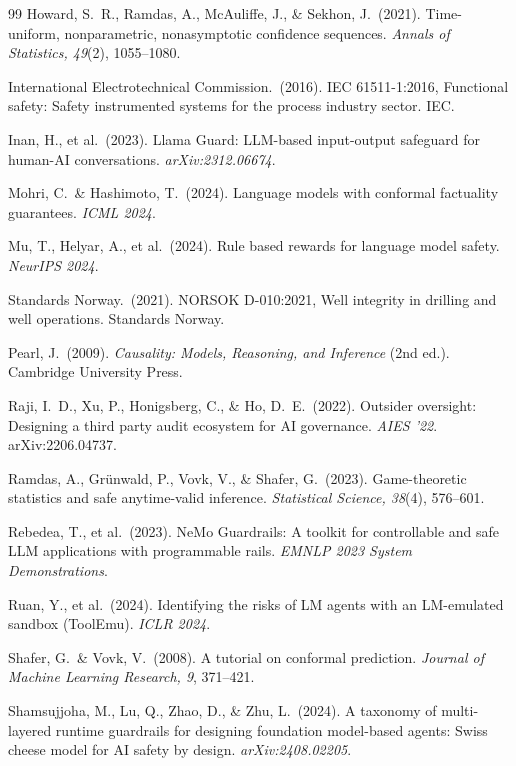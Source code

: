 \documentclass[10pt,twocolumn]{article}
\begin{document}
\begin{thebibliography}{99}
Howard, S.~R., Ramdas, A., McAuliffe, J., \& Sekhon, J.\ (2021).
Time-uniform, nonparametric, nonasymptotic confidence sequences.
\emph{Annals of Statistics, 49}(2), 1055--1080.

International Electrotechnical Commission.\ (2016).
IEC 61511-1:2016, Functional safety: Safety instrumented systems for the
process industry sector.
IEC.

Inan, H., et al.\ (2023).
Llama Guard: LLM-based input-output safeguard for human-AI conversations.
\emph{arXiv:2312.06674}.

Mohri, C.\ \& Hashimoto, T.\ (2024).
Language models with conformal factuality guarantees.
\emph{ICML 2024}.

Mu, T., Helyar, A., et al.\ (2024).
Rule based rewards for language model safety.
\emph{NeurIPS 2024}.

Standards Norway.\ (2021).
NORSOK D-010:2021, Well integrity in drilling and well operations.
Standards Norway.

Pearl, J.\ (2009).
\emph{Causality: Models, Reasoning, and Inference} (2nd ed.).
Cambridge University Press.

Raji, I.~D., Xu, P., Honigsberg, C., \& Ho, D.~E.\ (2022).
Outsider oversight: Designing a third party audit ecosystem for AI
governance.
\emph{AIES '22}. arXiv:2206.04737.

Ramdas, A., Gr\"unwald, P., Vovk, V., \& Shafer, G.\ (2023).
Game-theoretic statistics and safe anytime-valid inference.
\emph{Statistical Science, 38}(4), 576--601.

Rebedea, T., et al.\ (2023).
NeMo Guardrails: A toolkit for controllable and safe LLM applications with
programmable rails.
\emph{EMNLP 2023 System Demonstrations}.

Ruan, Y., et al.\ (2024).
Identifying the risks of LM agents with an LM-emulated sandbox (ToolEmu).
\emph{ICLR 2024}.

Shafer, G.\ \& Vovk, V.\ (2008).
A tutorial on conformal prediction.
\emph{Journal of Machine Learning Research, 9}, 371--421.

Shamsujjoha, M., Lu, Q., Zhao, D., \& Zhu, L.\ (2024).
A taxonomy of multi-layered runtime guardrails for designing foundation
model-based agents: Swiss cheese model for AI safety by design.
\emph{arXiv:2408.02205}.


\end{thebibliography}
\end{document}
